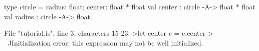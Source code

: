 \runverbatimfalse
{}
\begin{RunVerbatimMsg}
type circle   = {  radius: float;  center: float * float }
val center : circle -A-> float * float
val radius : circle -A-> float
\end{RunVerbatimMsg}
\begin{RunVerbatimErr}
File "tutorial.ls", line 3, characters 15-23:
>let center c = c.center
>               ^^^^^^^^
Initialization error: this expression may not be well initialized.
\end{RunVerbatimErr}
